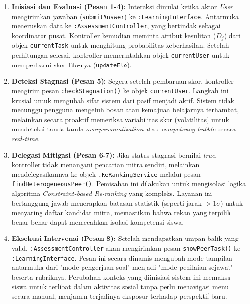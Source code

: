 \begin{enumerate}
    \item \textbf{Inisiasi dan Evaluasi (Pesan 1-4):}
    Interaksi dimulai ketika aktor \textit{User} mengirimkan jawaban (\texttt{submitAnswer}) ke \texttt{:LearningInterface}. Antarmuka meneruskan data ke \texttt{:AssessmentController}, yang bertindak sebagai koordinator pusat. Kontroller kemudian meminta atribut kesulitan ($D_j$) dari objek \texttt{currentTask} untuk menghitung probabilitas keberhasilan. Setelah perhitungan selesai, kontroller memerintahkan objek \texttt{currentUser} untuk memperbarui skor Elo-nya (\texttt{updateElo}).
    
    \item \textbf{Deteksi Stagnasi (Pesan 5):}
    Segera setelah pembaruan skor, kontroller mengirim pesan \texttt{checkStagnation()} ke objek \texttt{currentUser}. 
    Langkah ini krusial untuk mengubah sifat sistem dari pasif menjadi aktif. Sistem tidak menunggu pengguna mengeluh bosan atau kemajuan belajarnya terhambat, melainkan secara proaktif memeriksa variabilitas skor (volatilitas) untuk mendeteksi tanda-tanda \textit{overpersonalization} atau \textit{competency bubble} secara \textit{real-time}.
    
    \item \textbf{Delegasi Mitigasi (Pesan 6-7):}
    Jika status stagnasi bernilai \textit{true}, kontroller tidak menangani pencarian mitra sendiri, melainkan mendelegasikannya ke objek \texttt{:ReRankingService} melalui pesan \texttt{findHeterogeneousPeer()}.
    Pemisahan ini dilakukan untuk mengisolasi logika algoritma \textit{Constraint-based Re-ranking} \autocite{DeBiasio2023} yang kompleks. Layanan ini bertanggung jawab menerapkan batasan statistik (seperti jarak $>1\sigma$) untuk menyaring daftar kandidat mitra, memastikan bahwa rekan yang terpilih benar-benar dapat memecahkan isolasi kompetensi siswa.
    
    \item \textbf{Eksekusi Intervensi (Pesan 8):}
    Setelah mendapatkan umpan balik yang valid, \texttt{:AssessmentController} akan mengirimkan pesan \texttt{showPeerTask()} ke \texttt{:LearningInterface}.
    Pesan ini secara dinamis mengubah mode tampilan antarmuka dari "mode pengerjaan soal" menjadi "mode penilaian sejawat" beserta rubriknya. Perubahan konteks yang diinisiasi sistem ini memaksa siswa untuk terlibat dalam aktivitas sosial tanpa perlu menavigasi menu secara manual, menjamin terjadinya eksposur terhadap perspektif baru.
\end{enumerate}

